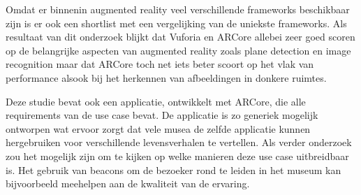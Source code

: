 Omdat er binnenin augmented reality veel verschillende frameworks beschikbaar zijn is er ook een shortlist met een vergelijking van de uniekste frameworks.
Als resultaat van dit onderzoek blijkt dat Vuforia en ARCore allebei zeer goed scoren op de belangrijke aspecten van augmented reality zoals plane detection en image recognition maar dat ARCore toch net iets beter scoort op het vlak van performance alsook bij het herkennen van afbeeldingen in donkere ruimtes.

Deze studie bevat ook een applicatie, ontwikkelt met ARCore, die alle requirements van de use case bevat. De applicatie is zo generiek mogelijk ontworpen wat ervoor zorgt dat vele musea de zelfde applicatie kunnen hergebruiken voor verschillende levensverhalen te vertellen. Als verder onderzoek zou het mogelijk zijn om te kijken op welke manieren deze use case uitbreidbaar is. Het gebruik van beacons om de bezoeker rond te leiden in het museum kan bijvoorbeeld meehelpen aan de kwaliteit van de ervaring.